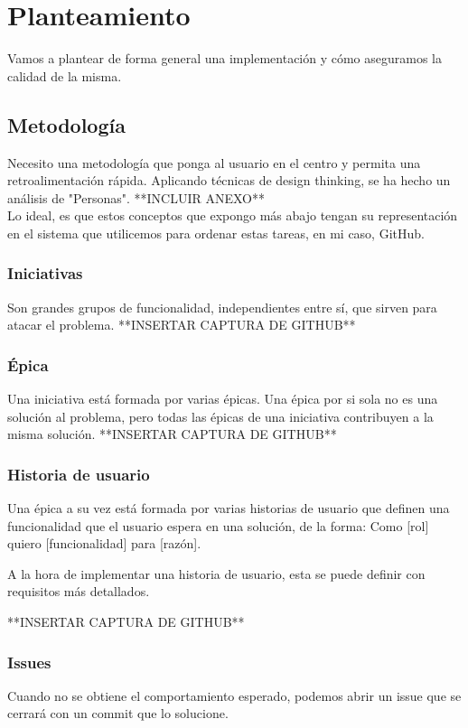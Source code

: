 \chapter{Planteamiento}

Vamos a plantear de forma general una implementación y cómo aseguramos la calidad de la misma.

\section{Metodología}

Necesito una metodología que ponga al usuario en el centro y permita una retroalimentación rápida.
Aplicando técnicas de design thinking, se ha hecho un análisis de "Personas". **INCLUIR ANEXO**
\\
Lo ideal, es que estos conceptos que expongo más abajo tengan su representación en el sistema que utilicemos
para ordenar estas tareas, en mi caso, GitHub.
\subsection{Iniciativas}
Son grandes grupos de funcionalidad, independientes entre sí, que sirven para atacar el problema.
**INSERTAR CAPTURA DE GITHUB**

\subsection{Épica}
Una iniciativa está formada por varias épicas. Una épica por si sola no es una solución al problema, pero todas las épicas de una iniciativa contribuyen a la misma solución.
**INSERTAR CAPTURA DE GITHUB**

\subsection{Historia de usuario}
Una épica a su vez está formada por varias historias de usuario que definen una funcionalidad que el usuario espera en una solución, de la forma: Como [rol] quiero [funcionalidad] para [razón].

A la hora de implementar una historia de usuario, esta se puede definir con requisitos más detallados.

**INSERTAR CAPTURA DE GITHUB**

\subsection{Issues}
Cuando no se obtiene el comportamiento esperado, podemos abrir un issue que se cerrará con un commit que lo solucione.

